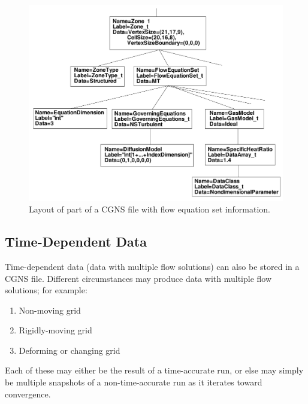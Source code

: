 \documentclass[12pt]{article}
\begin{document}
\begin{figure}[hpbt]
\centerline{{\includegraphics[width=150mm]{figures/tree_floweqn}}}
\caption{Layout of part of a CGNS file with
flow equation set information.}
\label{FIGtree_floweqn}
\end{figure}
%

\subsection{Time-Dependent Data} \label{sec:timeacc}

Time-dependent data (data with multiple flow solutions) can also be stored
in a CGNS file.  Different circumstances may produce
data with multiple flow solutions; for example:

\begin{enumerate}
\item Non-moving grid \label{Item1x}
\item Rigidly-moving grid \label{Item2x}
\item Deforming or changing grid \label{Item3x}
\end{enumerate}

\noindent Each of these may either be
the result of a time-accurate run, or else may simply be
multiple snapshots of a non-time-accurate run as it iterates toward
convergence.
\end{document}

